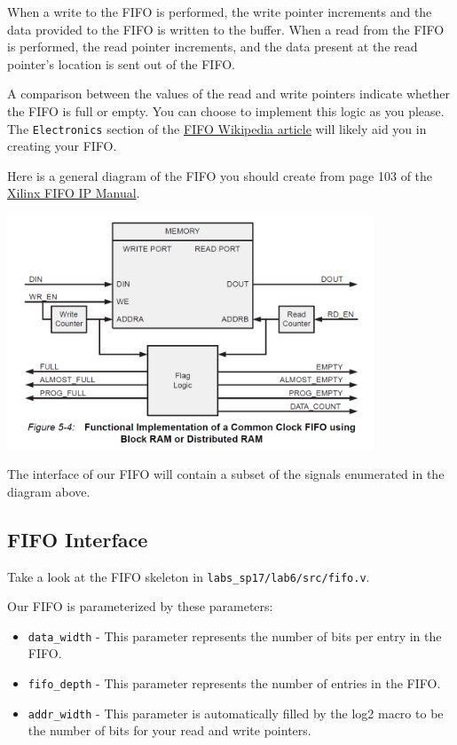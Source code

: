 \documentclass[11pt]{article}
\begin{document}
When a write to the FIFO is performed, the write pointer increments and the data provided to the FIFO is written to the buffer. When a read from the FIFO is performed, the read pointer increments, and the data present at the read pointer's location is sent out of the FIFO.

A comparison between the values of the read and write pointers indicate whether the FIFO is full or empty. You can choose to implement this logic as you please. The \verb|Electronics| section of the \href{https://en.wikipedia.org/wiki/FIFO_(computing_and_electronics)}{FIFO Wikipedia article} will likely aid you in creating your FIFO.

Here is a general diagram of the FIFO you should create from page 103 of the \href{https://www.xilinx.com/support/documentation/ip_documentation/fifo_generator_ug175.pdf}{Xilinx FIFO IP Manual}.

\begin{center}
	\includegraphics[height=7cm]{sync_fifo_diagram.png}
\end{center}

The interface of our FIFO will contain a subset of the signals enumerated in the diagram above.

\subsection{FIFO Interface}
Take a look at the FIFO skeleton in \verb|labs_sp17/lab6/src/fifo.v|.

Our FIFO is parameterized by these parameters:
\begin{itemize}
	\item \verb|data_width| - This parameter represents the number of bits per entry in the FIFO.
	\item \verb|fifo_depth| - This parameter represents the number of entries in the FIFO.
	\item \verb|addr_width| - This parameter is automatically filled by the log2 macro to be the number of bits for your read and write pointers.
\end{itemize}
\end{document}

